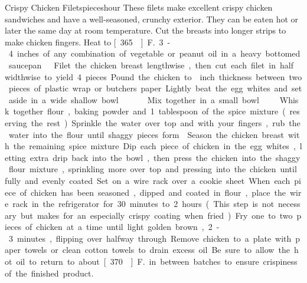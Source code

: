 \begin{recipe}{Crispy Chicken Filets}{\unit[6-8]{pieces}}{\unit[1]{hour}}
\freeform These filets make excellent crispy chicken sandwiches and have a
well-seasoned, crunchy exterior. They can be eaten hot or later the
same day at room temperature. Cut the breasts into longer strips to
make chicken fingers.
\newstep Heat to \unit[365\0]{F.} 3-4 inches of any combination of vegetable or
peanut oil in a heavy bottomed saucepan.
Filet the chicken breast lengthwise, then cut each filet in half
widthwise to yield 4 pieces. Pound the chicken to  inch thickness
between two pieces of plastic wrap or butchers paper. Lightly beat the
egg whites and set aside in a wide shallow bowl.
Mix together in a small bowl
Whisk together flour, baking powder and 1 tablespoon of the spice mixture (reserving the rest). Sprinkle the
water over top and with your fingers, rub the water into the flour
until shaggy pieces form.
\freeform Season the chicken breast with the remaining spice mixture. Dip each
piece of chicken in the egg whites, letting extra drip back into the
bowl, then press the chicken into the shaggy flour mixture, sprinkling
more over top and pressing into the chicken until fully and evenly
coated. Set on a wire rack over a cookie sheet. When each piece of
chicken has been seasoned, dipped and coated in flour, place the wire
rack in the refrigerator for 30 minutes to 2 hours. (This step is not
necessary but makes for an especially crispy coating when fried.) Fry
one to two pieces of chicken at a time until light golden brown, 2-3
minutes, flipping over halfway through. Remove chicken to a plate with
paper towels or clean cotton towels to drain excess oil. Be sure to
allow the hot oil to return to about \unit[370\0]{F.} in between
batches to ensure crispiness of the finished product.
\end{recipe}
